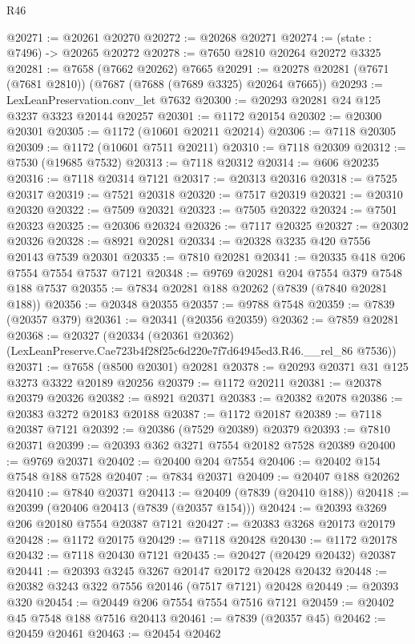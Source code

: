 \begin{lexlean}{R46}
\begin{coremodule}
@20271 := @20261 @20270
@20272 := @20268 @20271
@20274 := (state : @7496) -> @20265 @20272
@20278 := @7650 @2810 @20264 @20272 @3325
@20281 := @7658 (@7662 @20262) @7665
@20291 := @20278 @20281 (@7671 (@7681 @2810)) (@7687 (@7688 (@7689 @3325) @20264 @7665))
@20293 := LexLeanPreservation.conv_let @7632
@20300 := @20293 @20281 @24 @125 @3237 @3323 @20144 @20257
@20301 := @1172 @20154
@20302 := @20300 @20301
@20305 := @1172 (@10601 @20211 @20214)
@20306 := @7118 @20305
@20309 := @1172 (@10601 @7511 @20211)
@20310 := @7118 @20309
@20312 := @7530 (@19685 @7532)
@20313 := @7118 @20312
@20314 := @606 @20235
@20316 := @7118 @20314 @7121
@20317 := @20313 @20316
@20318 := @7525 @20317
@20319 := @7521 @20318
@20320 := @7517 @20319
@20321 := @20310 @20320
@20322 := @7509 @20321
@20323 := @7505 @20322
@20324 := @7501 @20323
@20325 := @20306 @20324
@20326 := @7117 @20325
@20327 := @20302 @20326
@20328 := @8921 @20281
@20334 := @20328 @3235 @420 @7556 @20143 @7539 @20301
@20335 := @7810 @20281
@20341 := @20335 @418 @206 @7554 @7554 @7537 @7121
@20348 := @9769 @20281 @204 @7554 @379 @7548 @188 @7537
@20355 := @7834 @20281 @188 @20262 (@7839 (@7840 @20281 @188))
@20356 := @20348 @20355
@20357 := @9788 @7548
@20359 := @7839 (@20357 @379)
@20361 := @20341 (@20356 @20359)
@20362 := @7859 @20281
@20368 := @20327
    (@20334 (@20361 @20362) (LexLeanPreserve.Cae723b4f28f25c6d220e7f7d64945ed3.R46.__rel_86 @7536))
@20371 := @7658 (@8500 @20301) @20281
@20378 := @20293 @20371 @31 @125 @3273 @3322 @20189 @20256
@20379 := @1172 @20211
@20381 := @20378 @20379 @20326
@20382 := @8921 @20371
@20383 := @20382 @2078
@20386 := @20383 @3272 @20183 @20188
@20387 := @1172 @20187
@20389 := @7118 @20387 @7121
@20392 := @20386 (@7529 @20389) @20379
@20393 := @7810 @20371
@20399 := @20393 @362 @3271 @7554 @20182 @7528 @20389
@20400 := @9769 @20371
@20402 := @20400 @204 @7554
@20406 := @20402 @154 @7548 @188 @7528
@20407 := @7834 @20371
@20409 := @20407 @188 @20262
@20410 := @7840 @20371
@20413 := @20409 (@7839 (@20410 @188))
@20418 := @20399 (@20406 @20413 (@7839 (@20357 @154)))
@20424 := @20393 @3269 @206 @20180 @7554 @20387 @7121
@20427 := @20383 @3268 @20173 @20179
@20428 := @1172 @20175
@20429 := @7118 @20428
@20430 := @1172 @20178
@20432 := @7118 @20430 @7121
@20435 := @20427 (@20429 @20432) @20387
@20441 := @20393 @3245 @3267 @20147 @20172 @20428 @20432
@20448 := @20382 @3243 @322 @7556 @20146 (@7517 @7121) @20428
@20449 := @20393 @320
@20454 := @20449 @206 @7554 @7554 @7516 @7121
@20459 := @20402 @45 @7548 @188 @7516 @20413
@20461 := @7839 (@20357 @45)
@20462 := @20459 @20461
@20463 := @20454 @20462

\end{coremodule}
\end{lexlean}
